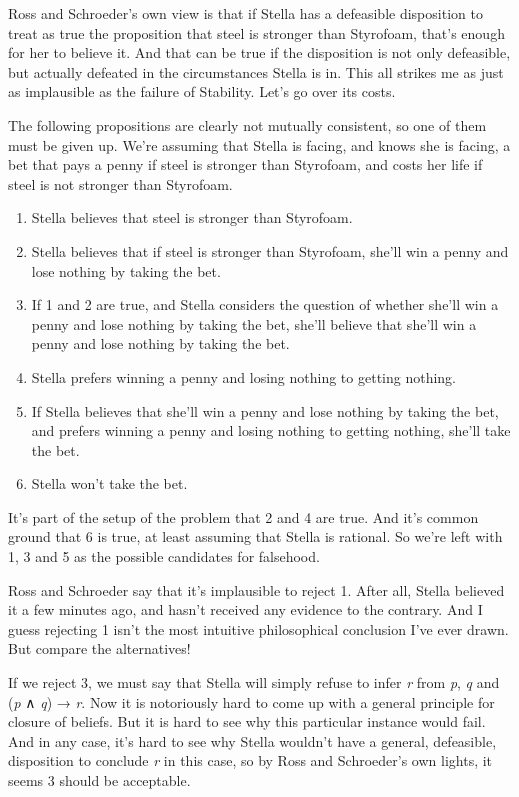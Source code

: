 \documentclass[
  12pt,
  letterpaper,
]{scrbook}
\providecommand{\tightlist}{%
  \setlength{\itemsep}{0pt}\setlength{\parskip}{0pt}}\usepackage{longtable,booktabs,array}
\begin{document}
Ross and Schroeder's own view is that if Stella has a defeasible
disposition to treat as true the proposition that steel is stronger than
Styrofoam, that's enough for her to believe it. And that can be true if
the disposition is not only defeasible, but actually defeated in the
circumstances Stella is in. This all strikes me as just as implausible
as the failure of Stability. Let's go over its costs.

The following propositions are clearly not mutually consistent, so one
of them must be given up. We're assuming that Stella is facing, and
knows she is facing, a bet that pays a penny if steel is stronger than
Styrofoam, and costs her life if steel is not stronger than Styrofoam.

\begin{enumerate}
\def\labelenumi{\arabic{enumi}.}
\tightlist
\item
  Stella believes that steel is stronger than Styrofoam.
\item
  Stella believes that if steel is stronger than Styrofoam, she'll win a
  penny and lose nothing by taking the bet.
\item
  If 1 and 2 are true, and Stella considers the question of whether
  she'll win a penny and lose nothing by taking the bet, she'll believe
  that she'll win a penny and lose nothing by taking the bet.
\item
  Stella prefers winning a penny and losing nothing to getting nothing.
\item
  If Stella believes that she'll win a penny and lose nothing by taking
  the bet, and prefers winning a penny and losing nothing to getting
  nothing, she'll take the bet.
\item
  Stella won't take the bet.
\end{enumerate}

It's part of the setup of the problem that 2 and 4 are true. And it's
common ground that 6 is true, at least assuming that Stella is rational.
So we're left with 1, 3 and 5 as the possible candidates for falsehood.

Ross and Schroeder say that it's implausible to reject 1. After all,
Stella believed it a few minutes ago, and hasn't received any evidence
to the contrary. And I guess rejecting 1 isn't the most intuitive
philosophical conclusion I've ever drawn. But compare the alternatives!

If we reject 3, we must say that Stella will simply refuse to infer
\emph{r} from \emph{p}, \emph{q} and (\emph{p} ∧ \emph{q}) → \emph{r}.
Now it is notoriously hard to come up with a general principle for
closure of beliefs. But it is hard to see why this particular instance
would fail. And in any case, it's hard to see why Stella wouldn't have a
general, defeasible, disposition to conclude \emph{r} in this case, so
by Ross and Schroeder's own lights, it seems 3 should be acceptable.
\end{document}
